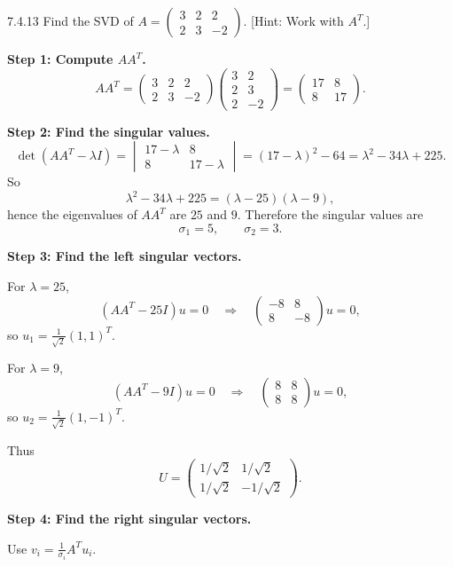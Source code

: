 \begin{exercise}{7.4.13}
Find the SVD of $A=\begin{pmatrix}3&2&2\\2&3&-2\end{pmatrix}$. [Hint: Work with $A^T$.]
\end{exercise}
\begin{solution}
\textbf{Step 1: Compute $AA^T$.}
\[
AA^T=
\begin{pmatrix}
3&2&2\\
2&3&-2
\end{pmatrix}
\begin{pmatrix}
3&2\\
2&3\\
2&-2
\end{pmatrix}
=
\begin{pmatrix}
17&8\\
8&17
\end{pmatrix}.
\]

\textbf{Step 2: Find the singular values.}
\[
\det(AA^T-\lambda I)
=
\begin{vmatrix}
17-\lambda&8\\
8&17-\lambda
\end{vmatrix}
=(17-\lambda)^2-64
=\lambda^2-34\lambda+225.
\]
So
\[
\lambda^2-34\lambda+225=(\lambda-25)(\lambda-9),
\]
hence the eigenvalues of $AA^T$ are $25$ and $9$. Therefore the singular values are
\[
\sigma_1=5,\qquad \sigma_2=3.
\]

\textbf{Step 3: Find the left singular vectors.}

For $\lambda=25$,
\[
(AA^T-25I)u=0
\quad\Rightarrow\quad
\begin{pmatrix}
-8&8\\
8&-8
\end{pmatrix}u=0,
\]
so $u_1=\frac{1}{\sqrt{2}}(1,1)^T$.

For $\lambda=9$,
\[
(AA^T-9I)u=0
\quad\Rightarrow\quad
\begin{pmatrix}
8&8\\
8&8
\end{pmatrix}u=0,
\]
so $u_2=\frac{1}{\sqrt{2}}(1,-1)^T$.

Thus
\[
U=
\begin{pmatrix}
1/\sqrt{2}&1/\sqrt{2}\\
1/\sqrt{2}&-1/\sqrt{2}
\end{pmatrix}.
\]

\textbf{Step 4: Find the right singular vectors.}

Use $v_i=\frac{1}{\sigma_i}A^Tu_i$.


\end{solution}
